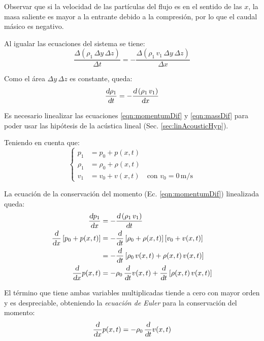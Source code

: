 \documentclass[a5paper,12pt,twoside]{book}
\begin{document}
Observar que si la velocidad de las partículas del flujo es en el sentido de las $x$, la masa saliente es mayor a la entrante debido a la compresión, por lo que el caudal másico es negativo.

Al igualar las ecuaciones del sistema se tiene:
\begin{equation}
    \frac{\Delta \left( \rho_1 \, \Delta y \, \Delta z \right)}{\Delta t}
    =
    -\frac{\Delta \left( \rho_1 \, v_1 \, \Delta y \, \Delta z \right)}{\Delta x}
    \label{eqn:massDelta}
\end{equation}

Como el área $\Delta y \, \Delta z$ es constante, queda:
\begin{equation}
    \frac{\textsl{d} \rho_1}{\textsl{d} t} = - \frac{\textsl{d} \left( \rho_1 \, v_1 \right)}{\textsl{d} x}
    \label{eqn:massDif}
\end{equation}

Es necesario linealizar las ecuaciones \ref{eqn:momentumDif} y \ref{eqn:massDif} para poder usar las hipótesis de la acústica lineal (Sec. \ref{sec:linAcousticHyp}).

Teniendo en cuenta que:
\begin{equation*}
    \left\{
    \begin{aligned}
        p_1 &= p_0 + p(x,t)
        \\
        \rho_1 &= \rho_0 + \rho(x,t)
        \\
        v_1 &= v_0 + v(x,t) \quad \textrm{con } v_0=0\,\si{\metre\per\second}
    \end{aligned}
    \right.
\end{equation*}

La ecuación de la conservación del momento (Ec. \ref{eqn:momentumDif}) linealizada queda:
\begin{align*}
    \frac{\textsl{d} p_1}{\textsl{d} x}
    &= - \frac{\textsl{d} \left( \rho_1 \, v_1 \right)}{\textsl{d} t}
    \\
    \frac{\textsl{d}}{\textsl{d} x} \left[ p_0 + p(x,t) \right]
    &= - \frac{\textsl{d}}{\textsl{d} t} \left[ \rho_0 + \rho(x,t) \right] \left[ v_0 + v(x,t) \right]
    \\
    &= - \frac{\textsl{d}}{\textsl{d} t} \left[ \rho_0 \, v(x,t) + \rho(x,t) \, v(x,t) \right]
    \\
    \frac{\textsl{d}}{\textsl{d} x} p(x,t)
    &= - \rho_0 \, \frac{\textsl{d}}{\textsl{d} t} v(x,t) + \frac{\textsl{d}}{\textsl{d} t} \left[ \rho(x,t) \, v(x,t) \right]
\end{align*}

El término que tiene ambas variables multiplicadas tiende a cero con mayor orden y es despreciable, obteniendo la \emph{ecuación de Euler} para la conservación del momento:
\begin{equation}
    \frac{\textsl{d}}{\textsl{d} x} p(x,t) = - \rho_0 \, \frac{\textsl{d}}{\textsl{d} t} v(x,t)
    \label{eqn:EulerMomentumConservation}
\end{equation}
\end{document}
